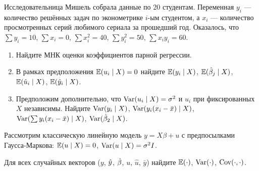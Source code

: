 \begin{problem}
Исследовательница Мишель собрала данные по 20 студентам. 
Переменная $y_i$ — количество решённых задач по эконометрике $i$-ым студентом, 
а $x_i$ — количество просмотренных серий любимого сериала за прошедший год. 
Оказалось, что $\sum y_i = 10$, $\sum x_i = 0$, $\sum x_i^2 = 40$, $\sum y_i^2 = 50$, $\sum x_i y_i = 60$.

\begin{enumerate}
\item Найдите МНК оценки коэффициентов парной регрессии.

\item В рамках предположения $\operatorname{\mathbb E}(u_i \mid X) = 0$ найдите $\operatorname{\mathbb E}(y_i \mid X)$, $\operatorname{\mathbb E}(\hat{\beta}_j \mid X)$, $\operatorname{\mathbb E}(\hat u_i \mid X)$, $\operatorname{\mathbb E}(\hat y_i \mid X)$.

\item Предположим дополнительно, что $\operatorname{Var}(u_i \mid X)=\sigma^2$ и $u_i$ при фиксированных $X$ независимы. 
Найдите $\operatorname{Var}(y_i \mid X)$, $\operatorname{Var}(y_i (x_i - \bar x) \mid X)$, $\operatorname{Var}(\sum y_i (x_i - \bar x) \mid X)$, $\operatorname{Var}(\hat{\beta}_2 \mid X)$.

\end{enumerate}

\begin{sol}
\end{sol}
\end{problem}

\begin{problem}
Рассмотрим классическую линейную модель $y=X\beta + u$ с предпосылками Гаусса-Маркова: $\operatorname{\mathbb E}(u \mid X) = 0$, $\operatorname{Var}(u \mid X) = \sigma^2 I$.

Для всех случайных векторов ($y$, $\hat{y}$, $\hat{\beta}$, $u$, $\hat u$, $\bar y$) найдите $\operatorname{\mathbb E}(\cdot)$, $\operatorname{Var}(\cdot)$, $\operatorname{Cov}(\cdot, \cdot)$.

\begin{sol}
\end{sol}
\end{problem}



